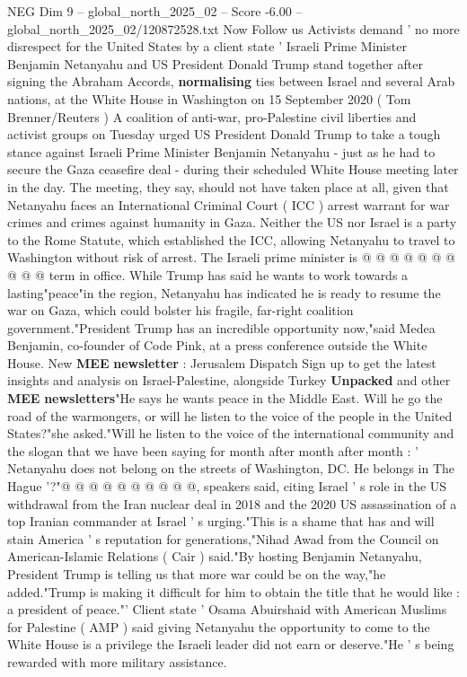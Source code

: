 \begin{textsample}{NEG Dim 9 – global\_north\_2025\_02 – Score -6.00 – global\_north\_2025\_02/120872528.txt}  \label{ex:f9_neg_018}
Now Follow us Activists demand ' no more disrespect for the United States by a client state ' Israeli Prime Minister Benjamin Netanyahu and US President Donald Trump stand together after signing the Abraham Accords, \textbf{normalising} ties between Israel and several Arab nations, at the White House in Washington on 15 September 2020 ( Tom Brenner/Reuters ) A coalition of anti-war, pro-Palestine civil liberties and activist groups on Tuesday urged US President Donald Trump to take a tough stance against Israeli Prime Minister Benjamin Netanyahu - just as he had to secure the Gaza ceasefire deal - during their scheduled White House meeting later in the day.
The meeting, they say, should not have taken place at all, given that Netanyahu faces an International Criminal Court ( ICC ) arrest warrant for war crimes and crimes against humanity in Gaza.
Neither the US nor Israel is a party to the Rome Statute, which established the ICC, allowing Netanyahu to travel to Washington without risk of arrest.
The Israeli prime minister is @ @ @ @ @ @ @ @ @ @ term in office.
While Trump has said he wants to work towards a lasting"peace"in the region, Netanyahu has indicated he is ready to resume the war on Gaza, which could bolster his fragile, far-right coalition government."President Trump has an incredible opportunity now,"said Medea Benjamin, co-founder of Code Pink, at a press conference outside the White House.
New \textbf{MEE} \textbf{newsletter} : Jerusalem Dispatch Sign up to get the latest insights and analysis on Israel-Palestine, alongside Turkey \textbf{Unpacked} and other \textbf{MEE} \textbf{newsletters}"He says he wants peace in the Middle East.
Will he go the road of the warmongers, or will he listen to the voice of the people in the United States?"she asked."Will he listen to the voice of the international community and the slogan that we have been saying for month after month after month : ' Netanyahu does not belong on the streets of Washington, DC.
He belongs in The Hague '?"@ @ @ @ @ @ @ @ @ @, speakers said, citing Israel ' s role in the US withdrawal from the Iran nuclear deal in 2018 and the 2020 US assassination of a top Iranian commander at Israel ' s urging."This is a shame that has and will stain America ' s reputation for generations,"Nihad Awad from the Council on American-Islamic Relations ( Cair ) said."By hosting Benjamin Netanyahu, President Trump is telling us that more war could be on the way,"he added."Trump is making it difficult for him to obtain the title that he would like : a president of peace."' Client state ' Osama Abuirshaid with American Muslims for Palestine ( AMP ) said giving Netanyahu the opportunity to come to the White House is a privilege the Israeli leader did not earn or deserve."He ' s being rewarded with more military assistance.

\end{textsample}
